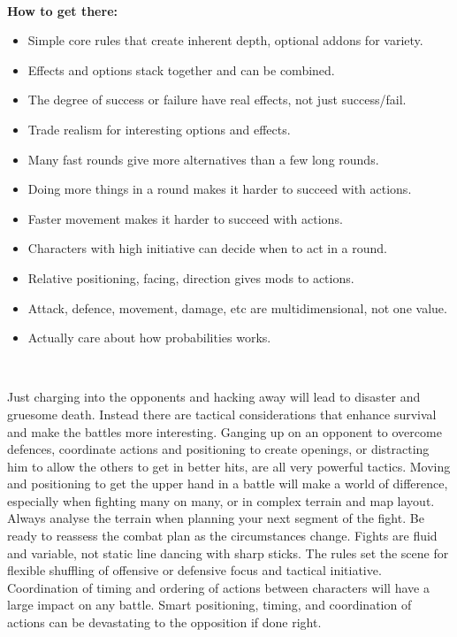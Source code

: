 \

\textbf{How to get there:}
\begin{itemize}
    \item Simple core rules that create inherent depth, optional addons for variety.
    \item Effects and options stack together and can be combined.
    \item The degree of success or failure have real effects, not just success/fail.
    \item Trade realism for interesting options and effects.
    \item Many fast rounds give more alternatives than a few long rounds.
    \item Doing more things in a round makes it harder to succeed with actions.
    \item Faster movement makes it harder to succeed with actions.
    \item Characters with high initiative can decide when to act in a round.
    \item Relative positioning, facing, direction gives mods to actions.
    \item Attack, defence, movement, damage, etc are multidimensional, not one value.
    \item Actually care about how probabilities works.
\end{itemize}

\

Just charging into the opponents and hacking away will lead to disaster and gruesome death. Instead there are tactical considerations that enhance survival and make the battles more interesting. Ganging up on an opponent to overcome defences, coordinate actions and positioning to create openings, or distracting him to allow the others to get in better hits, are all very powerful tactics. Moving and positioning to get the upper hand in a battle will make a world of difference, especially when fighting many on many, or in complex terrain and map layout. Always analyse the terrain when planning your next segment of the fight. Be ready to reassess the combat plan as the circumstances change. Fights are fluid and variable, not static line dancing with sharp sticks. The rules set the scene for flexible shuffling of offensive or defensive focus and tactical initiative. Coordination of timing and ordering of actions between characters will have a large impact on any battle. Smart positioning, timing, and coordination of actions can be devastating to the opposition if done right.


